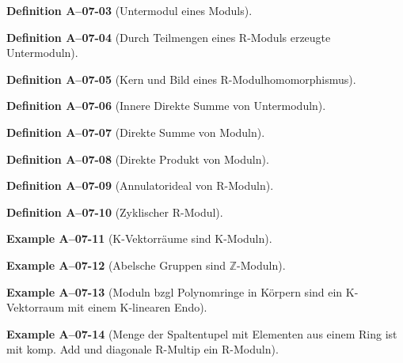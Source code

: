 \documentclass[10pt, letterpaper]{article}
\newcommand{\Z}{\mathbb{Z}}
\newcommand{\CustomHeading}[3]{%
  \par\medskip\noindent%
  \textbf{#1 #2} \textnormal{(#3)}.\enskip%
}
\newenvironment{DEF}[2]{\CustomHeading{Definition}{#1}{#2}}{}
\newenvironment{EXA}[2]{\CustomHeading{Example}{#1}{#2}}{}
\begin{document}
\begin{DEF}{A--07-03}{Untermodul eines Moduls}
\end{DEF}

\begin{DEF}{A--07-04}{Durch Teilmengen eines R-Moduls erzeugte Untermoduln}
\end{DEF}

\begin{DEF}{A--07-05}{Kern und Bild eines R-Modulhomomorphismus}
\end{DEF}

\begin{DEF}{A--07-06}{Innere Direkte Summe von Untermoduln}
\end{DEF}

\begin{DEF}{A--07-07}{Direkte Summe von Moduln}
\end{DEF}

\begin{DEF}{A--07-08}{Direkte Produkt von Moduln}
\end{DEF}

\begin{DEF}{A--07-09}{Annulatorideal von R-Moduln}
\end{DEF}

\begin{DEF}{A--07-10}{Zyklischer R-Modul}
\end{DEF}

\begin{EXA}{A--07-11}{K-Vektorräume sind K-Moduln}
\end{EXA}

\begin{EXA}{A--07-12}{Abelsche Gruppen sind $\Z$-Moduln}
\end{EXA}

\begin{EXA}{A--07-13}{Moduln bzgl Polynomringe in Körpern sind ein K-Vektorraum mit einem K-linearen Endo}
\end{EXA}

\begin{EXA}{A--07-14}{Menge der Spaltentupel mit Elementen aus einem Ring ist mit komp. Add und diagonale R-Multip ein R-Moduln}
\end{EXA}
\end{document}
